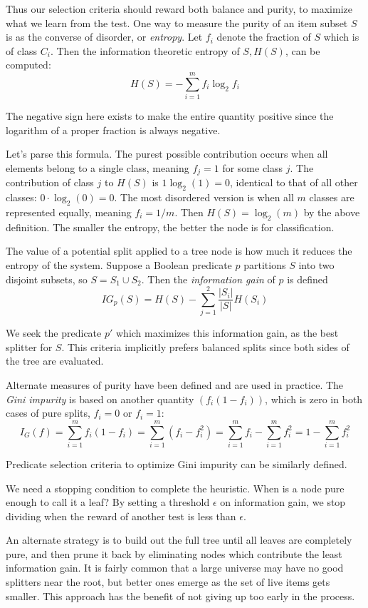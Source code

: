 \documentclass[10pt]{article}
\begin{document}
\begin{enumerate}
Thus our selection criteria should reward both balance and purity, to maximize what we learn from the test. One way to measure the purity of an item subset $S$ is as the converse of disorder, or \textit{entropy}. Let $f_i$ denote the fraction of $S$ which is of class $C_i$. Then the information theoretic entropy of $S, H(S)$, can be computed:
\[
H(S) = -\sum_{i=1}^{m} f_i \log_2 f_i 
\]

The negative sign here exists to make the entire quantity positive since the logarithm of a proper fraction is always negative.

Let's parse this formula. The purest possible contribution occurs when all elements belong to a single class, meaning $f_j=1$ for some class $j$. The contribution of class $j$ to $H(S)$ is $1 \log_2(1)=0$, identical to that of all other classes: $0 \cdot \log_2(0)=0$. The most disordered version is when all $m$ classes are represented equally, meaning $f_i=1 / m$. Then $H(S)=\log_2(m)$ by the above definition. The smaller the entropy, the better the node is for classification.

The value of a potential split applied to a tree node is how much it reduces the entropy of the system. Suppose a Boolean predicate $p$ partitions $S$ into two disjoint subsets, so $S=S_1 \cup S_2$. Then the\textit{ information gain} of $p$ is defined
\[
IG_p(S) = H(S) - \sum_{j=1}^{2} \frac{|S_i|}{|S|} H(S_i)
\]

We seek the predicate $p'$ which maximizes this information gain, as the best splitter for $S$. This criteria implicitly prefers balanced splits since both sides of the tree are evaluated.

Alternate measures of purity have been defined and are used in practice. The \textit{Gini impurity} is based on another quantity $\left(f_i \left(1-f_i \right)\right)$, which is zero in both cases of pure splits, $f_i =0$ or $f_i =1$:
\[
I_G(f) = \sum_{i=1}^{m} f_i \left(1-f_i \right)=\sum_{i=1}^{m}\left(f_i -f_i^2 \right)=\sum_{i=1}^{m} f_i -\sum_{i=1}^{m} f_i^2=1-\sum_{i=1}^{m} f_i^2
\]

Predicate selection criteria to optimize Gini impurity can be similarly defined.

We need a stopping condition to complete the heuristic. When is a node pure enough to call it a leaf? By setting a threshold $\epsilon$ on information gain, we stop dividing when the reward of another test is less than $\epsilon$.

An alternate strategy is to build out the full tree until all leaves are completely pure, and then prune it back by eliminating nodes which contribute the least information gain. It is fairly common that a large universe may have no good splitters near the root, but better ones emerge as the set of live items gets smaller. This approach has the benefit of not giving up too early in the process.


\end{enumerate}
\end{document}
